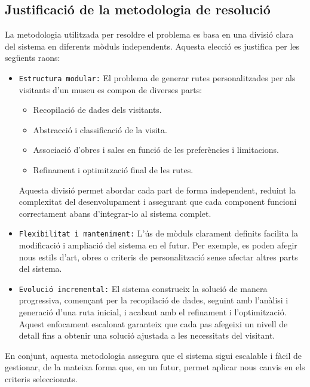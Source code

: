 \documentclass[a4paper]{article}
\begin{document}
	
	\subsection{Justificació de la metodologia de resolució}
	
	La metodologia utilitzada per resoldre el problema es basa en una divisió clara del sistema en diferents mòduls independents. Aquesta elecció es justifica per les següents raons:
	
	\begin{itemize}
		\item \texttt{Estructura modular:} El problema de generar rutes personalitzades per als visitants d’un museu es compon de diverses parts:
		\begin{itemize}
			\item Recopilació de dades dels visitants.
			\item Abstracció i classificació de la visita.
			\item Associació d’obres i sales en funció de les preferències i limitacions.
			\item Refinament i optimització final de les rutes.
		\end{itemize}
		Aquesta divisió permet abordar cada part de forma independent, reduint la complexitat del desenvolupament i assegurant que cada component funcioni correctament abans d’integrar-lo al sistema complet.
		
		\item \texttt{Flexibilitat i manteniment:} L'ús de mòduls clarament definits facilita la modificació i ampliació del sistema en el futur. Per exemple, es poden afegir nous estils d’art, obres o criteris de personalització sense afectar altres parts del sistema.
		
		\item \texttt{Evolució incremental:} El sistema construeix la solució de manera progressiva, començant per la recopilació de dades, seguint amb l’anàlisi i generació d’una ruta inicial, i acabant amb el refinament i l’optimització. Aquest enfocament escalonat garanteix que cada pas afegeixi un nivell de detall fins a obtenir una solució ajustada a les necessitats del visitant.
		
	\end{itemize}
	
	En conjunt, aquesta metodologia assegura que el sistema sigui escalable i fàcil de gestionar, de la mateixa forma que, en un futur, permet aplicar nous canvis en els criteris seleccionats.
\end{document}

